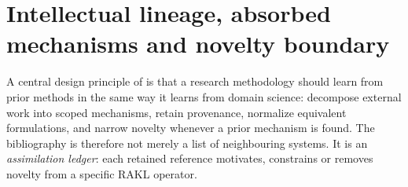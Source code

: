\section{Intellectual lineage, absorbed mechanisms and novelty boundary}
\label{sec:intellectual-lineage}
A central design principle of \RAKL{} is that a research methodology should learn from prior methods in the same way it learns from domain science: decompose external work into scoped mechanisms, retain provenance, normalize equivalent formulations, and narrow novelty whenever a prior mechanism is found. The bibliography is therefore not merely a list of neighbouring systems. It is an \emph{assimilation ledger}: each retained reference motivates, constrains or removes novelty from a specific RAKL operator.






